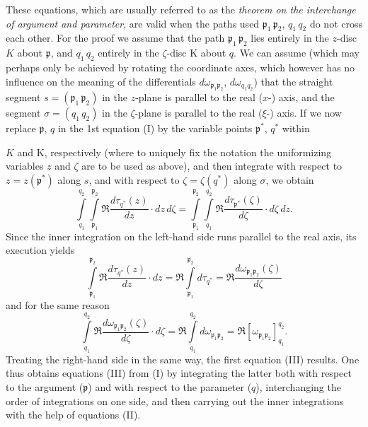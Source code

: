 \documentclass{article}
\begin{document}
These equations, which are usually referred to as the \emph{theorem on the interchange of argument and parameter}, are valid when the paths used $\mathfrak{p}_1\,\mathfrak{p}_2$, $q_1\,q_2$ do not cross each other. For the proof we assume that the path $\mathfrak{p}_1\,\mathfrak{p}_2$ lies entirely in the $z$-disc $K$ about $\mathfrak{p}$, and $q_1\,q_2$ entirely in the $\zeta$-disc $\mathrm{K}$ about $q$. We can assume (which may perhaps only be achieved by rotating the coordinate axes, which however has no influence on the meaning of the differentials $d\omega_{\mathfrak{p}_1 \mathfrak{p}_2}$, $d\omega_{q_1 q_2}$) that the straight segment $s = (\mathfrak{p}_1\,\mathfrak{p}_2)$ in the $z$-plane is parallel to the real ($x$-) axis, and the segment $\sigma = (q_1\,q_2)$ in the $\zeta$-plane is parallel to the real ($\xi$-) axis. If we now replace $\mathfrak{p}$, $q$ in the 1st equation (I) by the variable points $\mathfrak{p}^*$, $q^*$ within

$K$ and $\mathrm{K}$, respectively (where to uniquely fix the notation the uniformizing variables $z$ and $\zeta$ are to be used as above), and then integrate with respect to $z = z(\mathfrak{p}^*)$ along $s$, and with respect to $\zeta = \zeta(q^*)$ along $\sigma$, we obtain
\[ \int\limits_{q_1}^{q_2} \int\limits_{\mathfrak{p}_1}^{\mathfrak{p}_2} \Re \frac{d\tau_{q^*}(z)}{dz} \cdot dz\,d\zeta = \int\limits_{\mathfrak{p}_1}^{\mathfrak{p}_2} \int\limits_{q_1}^{q_2} \Re \frac{d\tau_{\mathfrak{p}^*}(\zeta)}{d\zeta} \cdot d\zeta\,dz. \]
Since the inner integration on the left-hand side runs parallel to the real axis, its execution yields
\[ \int\limits_{\mathfrak{p}_1}^{\mathfrak{p}_2} \Re \frac{d\tau_{q^*}(z)}{dz} \cdot dz = \Re \int\limits_{\mathfrak{p}_1}^{\mathfrak{p}_2} d\tau_{q^*} = \Re \frac{d\omega_{\mathfrak{p}_1 \mathfrak{p}_2}(\zeta)}{d\zeta} \]
and for the same reason
\[ \int\limits_{q_1}^{q_2} \Re \frac{d\omega_{\mathfrak{p}_1 \mathfrak{p}_2}(\zeta)}{d\zeta} \cdot d\zeta = \Re \int\limits_{q_1}^{q_2} d\omega_{\mathfrak{p}_1 \mathfrak{p}_2} = \Re [\omega_{\mathfrak{p}_1 \mathfrak{p}_2}]_{q_1}^{q_2}. \]
Treating the right-hand side in the same way, the first equation (III) results. One thus obtains equations (III) from (I) by integrating the latter both with respect to the argument ($\mathfrak{p}$) and with respect to the parameter ($q$), interchanging the order of integrations on one side, and then carrying out the inner integrations with the help of equations (II).
\end{document}
